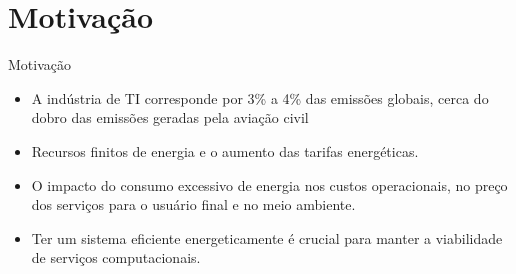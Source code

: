 \section{Motivação}

\begin{frame}{Motivação}
    \begin{itemize}
        \item A indústria de TI corresponde por 3\% a 4\% das emissões globais, cerca do dobro das emissões geradas pela aviação civil
        \item Recursos finitos de energia e o aumento das tarifas energéticas.
        \item O impacto do consumo excessivo de energia nos custos operacionais, no preço dos serviços para o usuário final e no meio ambiente.
        \item Ter um sistema eficiente energeticamente é crucial para manter a viabilidade de serviços computacionais.
    \end{itemize}
\end{frame}
